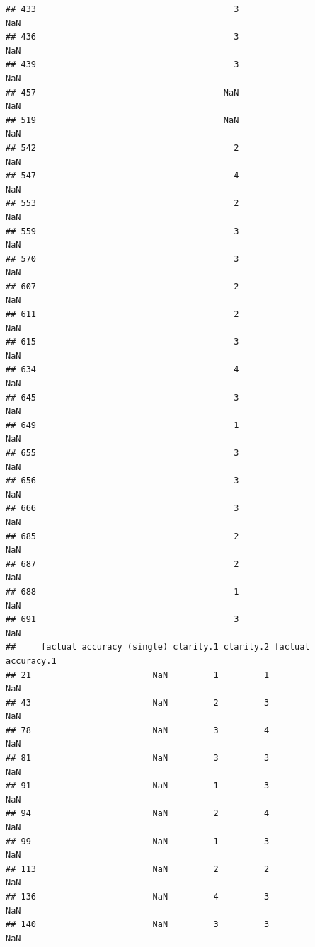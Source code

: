 \documentclass[
]{article}
\begin{document}
\begin{verbatim}
## 433                                       3                             NaN
## 436                                       3                             NaN
## 439                                       3                             NaN
## 457                                     NaN                             NaN
## 519                                     NaN                             NaN
## 542                                       2                             NaN
## 547                                       4                             NaN
## 553                                       2                             NaN
## 559                                       3                             NaN
## 570                                       3                             NaN
## 607                                       2                             NaN
## 611                                       2                             NaN
## 615                                       3                             NaN
## 634                                       4                             NaN
## 645                                       3                             NaN
## 649                                       1                             NaN
## 655                                       3                             NaN
## 656                                       3                             NaN
## 666                                       3                             NaN
## 685                                       2                             NaN
## 687                                       2                             NaN
## 688                                       1                             NaN
## 691                                       3                             NaN
##     factual accuracy (single) clarity.1 clarity.2 factual accuracy.1
## 21                        NaN         1         1                NaN
## 43                        NaN         2         3                NaN
## 78                        NaN         3         4                NaN
## 81                        NaN         3         3                NaN
## 91                        NaN         1         3                NaN
## 94                        NaN         2         4                NaN
## 99                        NaN         1         3                NaN
## 113                       NaN         2         2                NaN
## 136                       NaN         4         3                NaN
## 140                       NaN         3         3                NaN

\end{verbatim}
\end{document}
